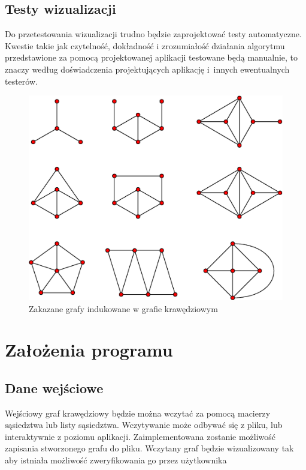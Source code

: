 \documentclass{article}
\begin{document}
\subsection{Testy wizualizacji}

Do przetestowania wizualizacji trudno będzie zaprojektować testy automatyczne. Kwestie takie jak czytelność, dokładność i zrozumiałość działania algorytmu przedstawione za pomocą projektowanej aplikacji testowane będą manualnie, to znaczy według doświadczenia projektujących aplikację i~innych ewentualnych testerów.

\begin{figure}[h!]
	\includegraphics[width=\linewidth]{forbidden.eps}
	\caption{Zakazane grafy indukowane w grafie krawędziowym}
	\label{fig:forbidden}
\end{figure}

\section{Założenia programu}

\subsection{Dane wejściowe}

Wejściowy graf krawędziowy będzie można wczytać za pomocą macierzy sąsiedztwa lub listy sąsiedztwa. Wczytywanie może odbywać się z pliku, lub interaktywnie z poziomu aplikacji. Zaimplementowana zostanie możliwość zapisania stworzonego grafu do pliku. 
Wczytany graf będzie wizualizowany tak aby istniała możliwość zweryfikowania go przez użytkownika
\end{document}

